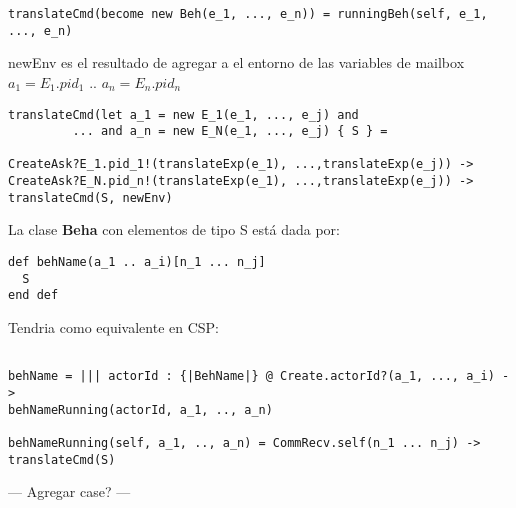 \documentclass[fleqn]{article}
\begin{document}
\begin{verbatim}
translateCmd(become new Beh(e_1, ..., e_n)) = runningBeh(self, e_1, ..., e_n)
\end{verbatim}

newEnv es el resultado de agregar a el entorno de las variables de mailbox $a_1
= E_1.pid_1$ .. $a_n = E_n.pid_n$
\begin{verbatim}
translateCmd(let a_1 = new E_1(e_1, ..., e_j) and 
         ... and a_n = new E_N(e_1, ..., e_j) { S } = 

CreateAsk?E_1.pid_1!(translateExp(e_1), ...,translateExp(e_j)) ->
CreateAsk?E_N.pid_n!(translateExp(e_1), ...,translateExp(e_j)) ->
translateCmd(S, newEnv)
\end{verbatim}


La clase \textbf{Beha} con elementos de tipo S está dada por:

\begin{verbatim}
def behName(a_1 .. a_i)[n_1 ... n_j]
  S
end def
\end{verbatim}

Tendria como equivalente en CSP:

\begin{verbatim}

behName = ||| actorId : {|BehName|} @ Create.actorId?(a_1, ..., a_i) ->
behNameRunning(actorId, a_1, .., a_n)

behNameRunning(self, a_1, .., a_n) = CommRecv.self(n_1 ... n_j) -> translateCmd(S)

\end{verbatim}

--- Agregar case? ---


{}

\end{document}
